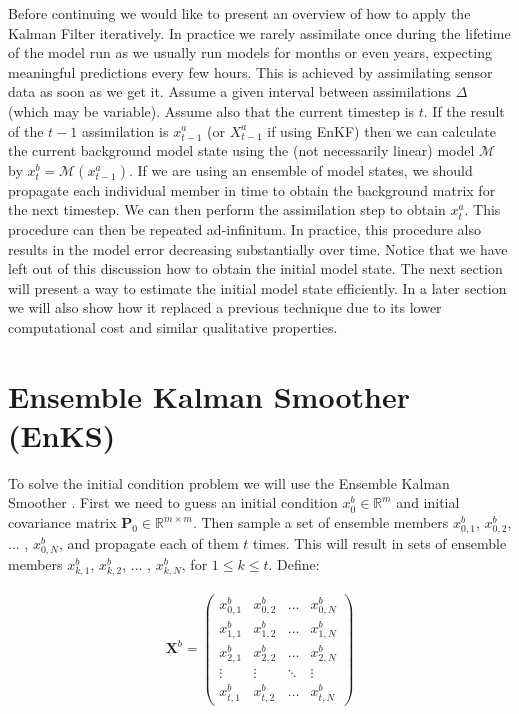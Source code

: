 \documentclass{article}
\begin{document}
Before continuing we would like to present an overview of how to apply the Kalman Filter iteratively. In practice we rarely assimilate once during the lifetime of the model run as we usually run models for months or even years, expecting meaningful predictions every few hours. This is achieved by assimilating sensor data as soon as we get it. Assume a given interval between assimilations $\Delta$ (which may be variable). Assume also that the current timestep is $t$. If the result of the $t - 1$ assimilation is $x_{t - 1}^a$ (or $X_{t - 1}^a$ if using EnKF) then we can calculate the current background model state using the (not necessarily linear) model $\mathcal{M}$ by $x_t^b = \mathcal{M} (x_{t - 1}^a)$. If we are using an ensemble of model states, we should propagate each individual member in time to obtain the background matrix for the next timestep. We can then perform the assimilation step to obtain $x_t^a$. This procedure can then be repeated ad-infinitum. In practice, this procedure also results in the model error decreasing substantially over time. Notice that we have left out of this discussion how to obtain the initial model state. The next section will present a way to estimate the initial model state efficiently. In a later section we will also show how it replaced a previous technique due to its lower computational cost and similar qualitative properties. \\

\section{Ensemble Kalman Smoother (EnKS)}

To solve the initial condition problem we will use the Ensemble Kalman Smoother \cite{Bannister2017}. First we need to guess an initial condition $x_0^b \in \mathbb{R}^m$ and initial covariance matrix $\mathbf{P}_0 \in \mathbb{R}^{m \times m}$. Then sample a set of ensemble members $x_{0, 1}^b$, $x_{0, 2}^b$, ... , $x_{0, N}^b$, and propagate each of them $t$ times. This will result in sets of ensemble members $x_{k, 1}^b$, $x_{k, 2}^b$, ... , $x_{k, N}^b$, for $1 \leq k \leq t$. Define:

\begin{gather*}
\mathbf{X}^b =
\begin{pmatrix}
x_{0, 1}^b & x_{0, 2}^b & \dots & x_{0, N}^b \\
x_{1, 1}^b & x_{1, 2}^b & \dots & x_{1, N}^b \\
x_{2, 1}^b & x_{2, 2}^b & \dots & x_{2, N}^b \\
\vdots & \vdots & \ddots & \vdots \\
x_{t, 1}^b & x_{t, 2}^b & \dots & x_{t, N}^b
\end{pmatrix} \\
\end{gather*}
\end{document}
